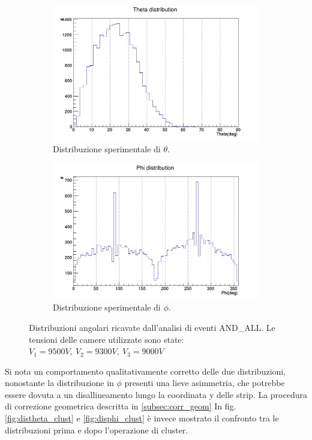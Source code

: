 \documentclass[8pt]{extarticle}
\begin{document}
\begin{figure}
\centering
\begin{subfigure}{.4\textwidth}
  \centering
  \includegraphics[width=1.2\linewidth]{distheta}
  \caption{Distribuzione sperimentale di $\theta$.}
  \label{fig:distheta}
\end{subfigure}%
\begin{subfigure}{.4\textwidth}
  \centering
  \includegraphics[width=1.2\linewidth]{disphi}
  \caption{Distribuzione sperimentale di $\phi$.}
  \label{fig:disphi}
\end{subfigure}
\caption{Distribuzioni angolari ricavate dall'analisi di eventi AND\_ALL. Le tensioni delle camere utilizzate sono state: $V_1 = 9500 V, \ V_2 = 9300 V,\ V_3 = 9000 V$}
\label{fig:disangolo}
\end{figure}

Si nota un comportamento qualitativamente corretto delle due distribuzioni, nonostante la distribuzione in $\phi$ presenti una lieve asimmetria, che potrebbe essere dovuta a un disallineamento lungo la coordinata y delle strip. La procedura di correzione geometrica descritta in \ref{subsec:corr_geom}   In fig. \ref{fig:distheta_clust} e \ref{fig:disphi_clust} è invece mostrato il confronto tra le distribuzioni prima e dopo l'operazione di cluster. \\
\end{document}

